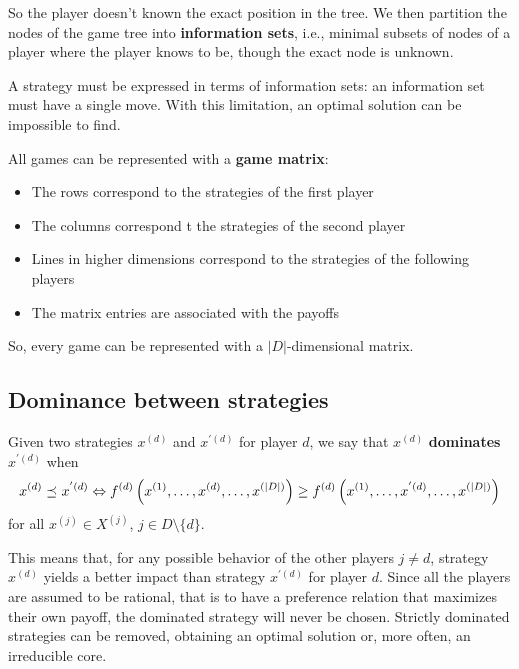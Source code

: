 So the player doesn't known the exact position in the tree. We then partition the nodes of the game tree into \textbf{information sets}, i.e., minimal subsets of nodes of a player where the player knows to be, though the exact node is unknown.

A strategy must be expressed in terms of information sets: an information set must have a single move. With this limitation, an optimal solution can be impossible to find.

All games can be represented with a \textbf{game matrix}:
\begin{itemize}
	\item The rows correspond to the strategies of the first player
	
	\item The columns correspond t the strategies of the second player 
	
	\item Lines in higher dimensions correspond to the strategies of the following players 
	
	\item The matrix entries are associated with the payoffs
\end{itemize}

So, every game can be represented with a $|D|$-dimensional matrix. 

\subsection{Dominance between strategies}

\begin{definition}
	Given two strategies $x^{(d)}$ and $x^{'(d)}$ for player $d$, we say that $x^{(d)}$ \textbf{dominates} $x^{'(d)}$ when
	$$ x^{(d)} \preceq_{} x^{'(d)} \Leftrightarrow f^{(d)} \left(x^{(1)}, \dots , x^{(d)}, \dots, x^{(|D|)}\right) \geq f^{(d)} \left(x^{(1)}, \dots, x^{'(d)}, \dots, x^{(|D|)}\right) $$
	for all $x^{(j)} \in X^{(j)}$, $j \in D \setminus \{d\}$.
\end{definition}

This means that, for any possible behavior of the other players $j \neq d$, strategy $x^{(d)}$ yields a better impact than strategy $x^{'(d)}$ for player $d$. Since all the players are assumed to be rational, that is to have a preference relation that maximizes their own payoff, the dominated strategy will never be chosen. Strictly dominated strategies can be removed, obtaining an optimal solution or, more often, an irreducible core.

